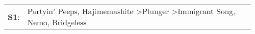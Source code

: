 \begin{supertabular}{p{0.03\textwidth}p{0.92\textwidth}}
 \textbf{S1}:  &  Partyin' Peeps\textsuperscript{}, \enspace Hajimemashite\textsuperscript{} \textgreater \enspace Plunger\textsuperscript{} \textgreater \enspace Immigrant Song\textsuperscript{}, \enspace Nemo\textsuperscript{}, \enspace Bridgeless\textsuperscript{}  \enspace  \\
\end{supertabular}
